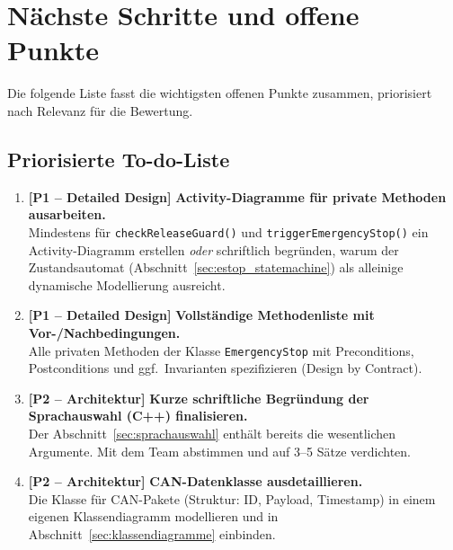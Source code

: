 \section{Nächste Schritte und offene Punkte}
\label{sec:naechste_schritte}

Die folgende Liste fasst die wichtigsten offenen Punkte zusammen,
priorisiert nach Relevanz für die Bewertung.

\subsection{Priorisierte To-do-Liste}

\begin{enumerate}
  \item \textbf{[P1 – Detailed Design]}
    \textbf{Activity-Diagramme für private Methoden ausarbeiten.} \\
    Mindestens für \texttt{checkReleaseGuard()} und
    \texttt{triggerEmergencyStop()} ein Activity-Diagramm erstellen
    \emph{oder} schriftlich begründen, warum der Zustandsautomat
    (Abschnitt~\ref{sec:estop_statemachine}) als alleinige
    dynamische Modellierung ausreicht.

  \item \textbf{[P1 – Detailed Design]}
    \textbf{Vollständige Methodenliste mit Vor-/Nachbedingungen.} \\
    Alle privaten Methoden der Klasse \texttt{EmergencyStop} mit
    Preconditions, Postconditions und ggf.\ Invarianten spezifizieren
    (Design by Contract).

  \item \textbf{[P2 – Architektur]}
    \textbf{Kurze schriftliche Begründung der Sprachauswahl (C++) finalisieren.} \\
    Der Abschnitt~\ref{sec:sprachauswahl} enthält bereits die wesentlichen
    Argumente. Mit dem Team abstimmen und auf 3--5 Sätze verdichten.

  \item \textbf{[P2 – Architektur]}
    \textbf{\ac{CAN}-Datenklasse ausdetaillieren.} \\
    Die Klasse für \ac{CAN}-Pakete (Struktur: ID, Payload, Timestamp) in einem
    eigenen Klassendiagramm modellieren und in Abschnitt~\ref{sec:klassendiagramme}
    einbinden.


\end{enumerate}
